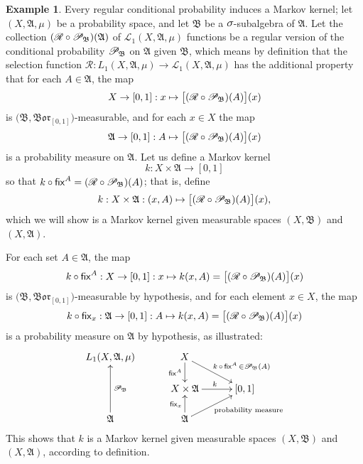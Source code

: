 \documentclass[
twoside=true,
paper=letter,
fontsize=11pt,
pagesize=auto,
leqno,
openany,
headsepline,
overfullrule,
]{scrbook}
\theoremstyle{plain}
\theoremstyle{plain}
\theoremstyle{definition}
\newtheorem{example}[thm]{Example}
\theoremstyle{bfnoteitalic}
\theoremstyle{bfnoteroman}
\newcommand{\sigalg}[1]{\mathfrak{#1}}
\newcommand{\cali}[1]{\mathscr{#1}}
\newcommand{\sfop}[1]{\mathsf{#1}}
\newcommand{\condprobop}[1]{\mathop{\cali{P}\hspace{-1pt}}\nolimits_{#1}}
\newcommand{\borel}{\mathfrak{Bor}}
\newcommand{\textsigma}{\hbox{\large{$\sigma$}}\kern-1pt}
\newcommand{\sigmaalgebra}{\sigalg{A}}
\newcommand{\sigmaalgebraii}{\sigalg{B}}
\newcommand{\Lone}{L_1(\measurespace, \sigmaalgebra, \measure)}
\newcommand{\caliLone}{\cali{L}_1(\measurespace, \sigmaalgebra, \measure)}
\newcommand{\measurespace}{X}
\newcommand{\mspaceelt}{x}
\newcommand{\measure}{\mu}
\newcommand{\seti}{A}
\newcommand{\regular}{\cali{R}}
\newcommand{\markovkernel}{k}
\newcommand{\fixinthefirst}[1]{\sfop{fix}_{#1}}
\newcommand{\fixinthesecond}[1]{\sfop{fix}^{#1}}
\begin{document}
\begin{example}\label{regular_conditional_probability_induces_markov_kernel}
Every regular conditional probability induces a Markov kernel;
let $(\measurespace,\sigmaalgebra,\measure)$ be a probability space, and let $\sigmaalgebraii$ be a $\textsigma$-subalgebra of $\sigmaalgebra$.
Let the collection 
$(\regular\circ\condprobop{\sigmaalgebraii})(\sigmaalgebra)$ 
of 
$\caliLone$ functions
be a regular version of the conditional probability $\condprobop{\sigmaalgebraii}$ on $\sigmaalgebra$ given $\sigmaalgebraii$, which means by definition that the selection function 
$\regular:\Lone\to\caliLone$
has the additional property that for each $\seti\in\sigmaalgebra$, the map 
\[
\measurespace\to [0,1] : \mspaceelt\mapsto
\bigl[ (\regular\circ\condprobop{\sigmaalgebraii}) (\seti)\bigr](\mspaceelt)
\]
is $\bigl(\sigmaalgebraii, \borel_{[0,1]}\bigr)$\hyp{}measurable, and for each 
$\mspaceelt\in\measurespace$ the map
\[
\sigmaalgebra\to [0,1]: \seti \mapsto 
\bigl[ (\regular\circ\condprobop{\sigmaalgebraii}) (\seti)\bigr](\mspaceelt)
\]
is a probability measure on $\sigmaalgebra$.
Let us define a Markov kernel
\[
\markovkernel : \measurespace\times\sigmaalgebra \to [0,1]
\]
so that
$\markovkernel \circ\fixinthesecond{\seti}
=
(\regular\circ\condprobop{\sigmaalgebraii}) (\seti)$;
that is, define
\[
\markovkernel : \measurespace\times\sigmaalgebra
: (\mspaceelt,\seti)\mapsto  
\bigl[ (\regular\circ\condprobop{\sigmaalgebraii}) (\seti)\bigr](\mspaceelt),
\]
which we will show is a Markov kernel given measurable spaces $(\measurespace,\sigmaalgebraii)$ and $(\measurespace, \sigmaalgebra)$.

For each set $\seti\in\sigmaalgebra$, the map
\[
\markovkernel\circ\fixinthesecond{\seti}
: \measurespace\to [0,1]
: \mspaceelt\mapsto \markovkernel(\mspaceelt, \seti)
= 
\bigl[ (\regular\circ\condprobop{\sigmaalgebraii}) (\seti)\bigr](\mspaceelt)
\]
is  $\bigl(\sigmaalgebraii, \borel_{[0,1]}\bigr)$\hyp{}measurable by hypothesis, and for each element $\mspaceelt\in\measurespace$, the map
\[
\markovkernel\circ\fixinthefirst{\mspaceelt}
: \sigmaalgebra\to [0,1]
: \seti\mapsto
\markovkernel(\mspaceelt, \seti)
=
\bigl[ (\regular\circ\condprobop{\sigmaalgebraii}) (\seti)\bigr](\mspaceelt)
\]
is a probability measure on
$\sigmaalgebra$ by hypothesis, as illustrated:
\[
\xymatrix@R=16pt@C=30pt{ 
\Lone &
\measurespace \ar[d]_-{\fixinthesecond{\seti}} 
\ar[dr]^{\ \quad\markovkernel\,\circ\,\fixinthesecond{\seti}\,
\in
\condprobop{\sigmaalgebraii}(\seti)}
\\
&\measurespace\times\sigmaalgebra \ar[r]^{\markovkernel} & [0,1] 
\\
\sigmaalgebra \ar[uu]_{\condprobop{\sigmaalgebraii}} & \sigmaalgebra
\ar[ur]_{\qquad\text{probability measure}} \ar[u]^{\fixinthefirst{\mspaceelt}} & 
\\
}
\]
This shows that $\markovkernel$ is a Markov kernel given measurable spaces $(\measurespace,\sigmaalgebraii)$ and $(\measurespace, \sigmaalgebra)$, according to definition. 
\end{example}
\end{document}
